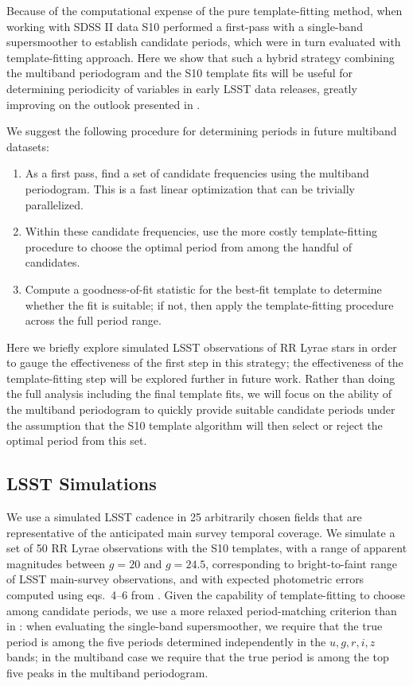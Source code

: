 \documentclass{emulateapj}
\begin{document}
Because of the computational expense of the pure template-fitting method, when working with SDSS II data S10 performed a first-pass with a single-band supersmoother to establish candidate periods, which were in turn evaluated with template-fitting approach.
Here we show that such a hybrid strategy combining the multiband periodogram and the S10 template fits will be useful for determining periodicity of variables in early LSST data releases, greatly improving on the outlook presented in \citet{Oluseyi12}.

We suggest the following procedure for determining periods in future multiband datasets:
\begin{enumerate}
   \item As a first pass, find a set of candidate frequencies using the multiband periodogram. This is a fast linear optimization that can be trivially parallelized.
   \item Within these candidate frequencies, use the more costly template-fitting procedure to choose the optimal period from among the handful of candidates.
   \item Compute a goodness-of-fit statistic for the best-fit template to determine whether the fit is suitable; if not, then apply the template-fitting procedure across the full period range.
\end{enumerate}
Here we briefly explore simulated LSST observations of RR Lyrae stars in order to gauge the effectiveness of the first step in this strategy; the effectiveness of the template-fitting step will be explored further in future work.
Rather than doing the full analysis including the final template fits, we will focus on the ability of the multiband periodogram to quickly provide suitable candidate periods under the assumption that the S10 template algorithm will then select or reject the optimal period from this set.

\subsection{LSST Simulations}

We use a simulated LSST cadence \citep{opsim1, opsim2, opsim3} in 25 arbitrarily chosen fields
that are representative of the anticipated main survey temporal coverage.
We simulate a set of 50 RR Lyrae observations with the S10 templates, with a range of apparent magnitudes between 
$g=20$ and $g=24.5$, corresponding to bright-to-faint range of LSST main-survey observations, and with expected 
photometric errors computed using eqs.~4--6  from \citet{Ivezic08LSST}. 
Given the capability of template-fitting to choose among candidate periods, we use a more relaxed period-matching criterion than in \citet{Oluseyi12}: when evaluating the single-band supersmoother, we require that the true period is among the five periods determined independently in the $u, g, r, i, z$ bands; in the multiband case we require that the true period is among the top five peaks in the multiband periodogram.
\end{document}
